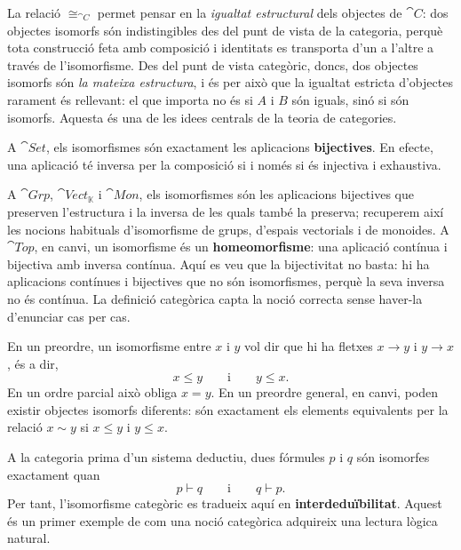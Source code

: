 \begin{observacio}
La relació $\cong_{\cat{C}}$ permet pensar en la \emph{igualtat estructural} dels objectes de $\cat{C}$: dos objectes isomorfs són indistingibles des del punt de vista de la categoria, perquè tota construcció feta amb composició i identitats es transporta d'un a l'altre a través de l'isomorfisme. Des del punt de vista categòric, doncs, dos objectes isomorfs són \emph{la mateixa estructura}, i és per això que la igualtat estricta d'objectes rarament és rellevant: el que importa no és si $A$ i $B$ són iguals, sinó si són isomorfs. Aquesta és una de les idees centrals de la teoria de categories.
\end{observacio}

\begin{exemple}
A $\cat{Set}$, els isomorfismes són exactament les aplicacions \textbf{bijectives}. En efecte, una aplicació té inversa per la composició si i només si és injectiva i exhaustiva.
\end{exemple}

\begin{exemple}
A $\cat{Grp}$, $\cat{Vect}_{\mathbb K}$ i $\cat{Mon}$, els isomorfismes són les aplicacions bijectives que preserven l'estructura i la inversa de les quals també la preserva; recuperem així les nocions habituals d'isomorfisme de grups, d'espais vectorials i de monoides. A $\cat{Top}$, en canvi, un isomorfisme és un \textbf{homeomorfisme}: una aplicació contínua i bijectiva amb inversa contínua. Aquí es veu que la bijectivitat no basta: hi ha aplicacions contínues i bijectives que no són isomorfismes, perquè la seva inversa no és contínua. La definició categòrica capta la noció correcta sense haver-la d'enunciar cas per cas.
\end{exemple}

\begin{exemple}
En un preordre, un isomorfisme entre $x$ i $y$ vol dir que hi ha fletxes $x\to y$ i $y\to x$, és a dir,
\[
x\le y
\qquad\text{i}\qquad
y\le x.
\]
En un ordre parcial això obliga $x=y$. En un preordre general, en canvi, poden existir objectes isomorfs diferents: són exactament els elements equivalents per la relació $x\sim y$ si $x\le y$ i $y\le x$.
\end{exemple}

\begin{exemple}
A la categoria prima d'un sistema deductiu, dues fórmules $p$ i $q$ són isomorfes exactament quan
\[
p\vdash q
\qquad\text{i}\qquad
q\vdash p.
\]
Per tant, l'isomorfisme categòric es tradueix aquí en \textbf{interdeduïbilitat}. Aquest és un primer exemple de com una noció categòrica adquireix una lectura lògica natural.
\end{exemple}

